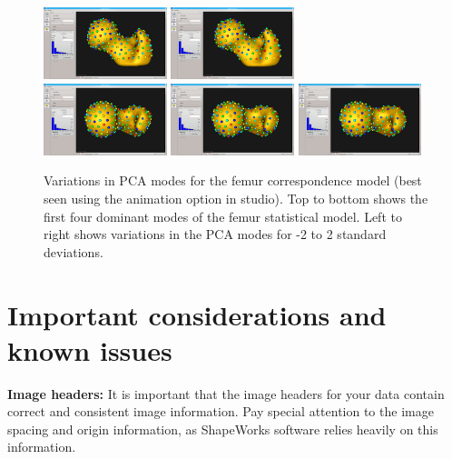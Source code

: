 \documentclass[letterpaper,12pt]{article}   %
\begin{document}
\begin{figure}[!htp]
	\includegraphics[width=0.32\textwidth]{figs_v2/femur_analyze_mode1_mean.png}
	\includegraphics[width=0.32\textwidth]{figs_v2/femur_analyze_mode3_pos2std.png} 	\\
	\includegraphics[width=0.32\textwidth]{figs_v2/femur_analyze_mode4_neg2std.png}
	\includegraphics[width=0.32\textwidth]{figs_v2/femur_analyze_mode4_mean.png}
	\includegraphics[width=0.32\textwidth]{figs_v2/femur_analyze_mode4_pos2std.png} 
	\caption{ Variations in PCA modes for the femur correspondence model (best seen using the animation option in studio). Top to bottom shows the first four dominant modes of the femur statistical model. Left to right shows variations in the PCA modes for -2 to 2 standard deviations. }
	\label{fig:femur_analyze_modes}
\end{figure}

\section{Important considerations and known issues}

\noindent\textbf{Image headers:} It is important that the image headers for your data contain correct and consistent image information. Pay special attention to the image spacing and origin information, as ShapeWorks software relies heavily on this information.
\end{document}
